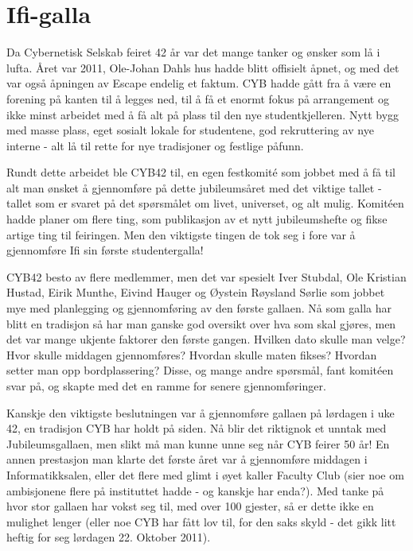 \chapter{Ifi-galla}

Da Cybernetisk Selskab feiret 42 år var det mange tanker og ønsker som lå i lufta. Året var 2011, Ole-Johan Dahls hus hadde blitt offisielt åpnet, og med det var også åpningen av Escape endelig et faktum. CYB hadde gått fra å være en forening på kanten til å legges ned, til å få et enormt fokus på arrangement og ikke minst arbeidet med å få alt på plass til den nye studentkjelleren. Nytt bygg med masse plass, eget sosialt lokale for studentene, god rekruttering av nye interne - alt lå til rette for nye tradisjoner og festlige påfunn.

Rundt dette arbeidet ble CYB42 til, en egen festkomité som jobbet med å få til alt man ønsket å gjennomføre på dette jubileumsåret med det viktige tallet - tallet som er svaret på det spørsmålet om livet, universet, og alt mulig. Komitéen hadde planer om flere ting, som publikasjon av et nytt jubileumshefte og fikse artige ting til feiringen. Men den viktigste tingen de tok seg i fore var å gjennomføre Ifi sin første studentergalla!

CYB42 besto av flere medlemmer, men det var spesielt Iver Stubdal, Ole Kristian Hustad, Eirik Munthe, Eivind Hauger og Øystein Røysland Sørlie som jobbet mye med planlegging og gjennomføring av den første gallaen. Nå som galla har blitt en tradisjon så har man ganske god oversikt over hva som skal gjøres, men det var mange ukjente faktorer den første gangen. Hvilken dato skulle man velge? Hvor skulle middagen gjennomføres? Hvordan skulle maten fikses? Hvordan setter man opp bordplassering? Disse, og mange andre spørsmål, fant komitéen svar på, og skapte med det en ramme for senere gjennomføringer.

Kanskje den viktigste beslutningen var å gjennomføre gallaen på lørdagen i uke 42, en tradisjon CYB har holdt på siden. Nå blir det riktignok et unntak med Jubileumsgallaen, men slikt må man kunne unne seg når CYB feirer 50 år! En annen prestasjon man klarte det første året var å gjennomføre middagen i Informatikksalen, eller det flere med glimt i øyet kaller Faculty Club (sier noe om ambisjonene flere på instituttet hadde - og kanskje har enda?). Med tanke på hvor stor gallaen har vokst seg til, med over 100 gjester, så er dette ikke en mulighet lenger (eller noe CYB har fått lov til, for den saks skyld - det gikk litt heftig for seg lørdagen 22. Oktober 2011).

